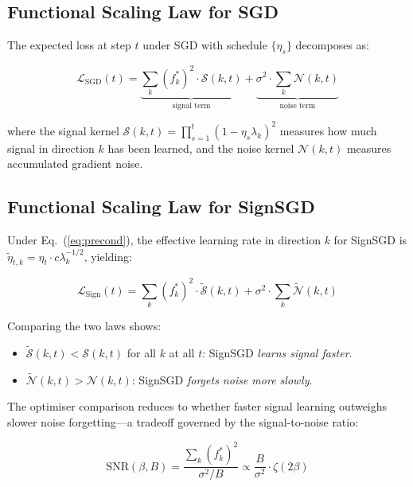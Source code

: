 \documentclass[10pt,twocolumn]{article}
\begin{document}
\subsection*{Functional Scaling Law for SGD}

The expected loss at step $t$ under SGD with schedule $\{\eta_s\}$ decomposes as:

\begin{equation}
\mathcal{L}_{\mathrm{SGD}}(t) = \underbrace{\sum_k (f^*_k)^2 \cdot \mathcal{S}(k,t)}_{\text{signal term}} + \underbrace{\sigma^2 \cdot \sum_k \mathcal{N}(k,t)}_{\text{noise term}}
\end{equation}

where the signal kernel $\mathcal{S}(k,t) = \prod_{s=1}^{t}(1-\eta_s \lambda_k)^2$ measures how much signal in direction $k$ has been learned, and the noise kernel $\mathcal{N}(k,t)$ measures accumulated gradient noise.

\subsection*{Functional Scaling Law for SignSGD}

Under Eq.~(\ref{eq:precond}), the effective learning rate in direction $k$ for SignSGD is $\tilde{\eta}_{t,k} = \eta_t \cdot c\lambda_k^{-1/2}$, yielding:

\begin{equation}
\mathcal{L}_{\mathrm{Sign}}(t) = \sum_k (f^*_k)^2 \cdot \tilde{\mathcal{S}}(k,t) + \sigma^2 \cdot \sum_k \tilde{\mathcal{N}}(k,t)
\end{equation}

Comparing the two laws shows:
\begin{itemize}[leftmargin=1em,itemsep=1pt]
  \item $\tilde{\mathcal{S}}(k,t) < \mathcal{S}(k,t)$ for all $k$ at all $t$: SignSGD \emph{learns signal faster}.
  \item $\tilde{\mathcal{N}}(k,t) > \mathcal{N}(k,t)$: SignSGD \emph{forgets noise more slowly}.
\end{itemize}

The optimiser comparison reduces to whether faster signal learning outweighs slower noise forgetting---a tradeoff governed by the signal-to-noise ratio:

\begin{equation}
\mathrm{SNR}(\beta,B) = \frac{\sum_k (f^*_k)^2}{\sigma^2/B} \propto \frac{B}{\sigma^2} \cdot \zeta(2\beta)
\end{equation}
\end{document}
